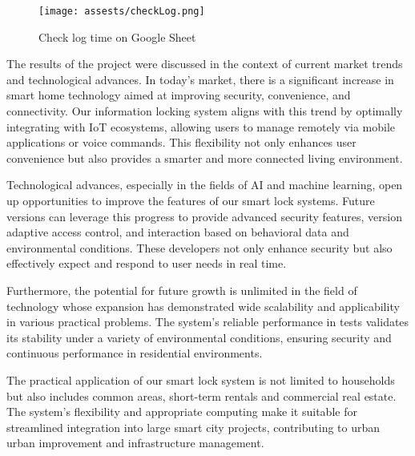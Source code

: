 \documentclass[conference, onecolumn]{IEEEtran}
\makeatletter
\def\subsection{\@startsection{subsection}{2}{\z@}{0.7ex plus 1ex minus 0.2ex}{0.5ex plus 0.2ex}{\normalfont\normalsize\bfseries}}
\makeatother
\begin{document}
\begin{figure}[H]
    \centering
    \texttt{[image: assests/checkLog.png]}
    \caption{Check log time on Google Sheet}
    \label{fig:googlesheet}
\end{figure}

\subsection{Discussion}
The results of the project were discussed in the context of current market trends and technological advances. In today's market, there is a significant increase in smart home technology aimed at improving security, convenience, and connectivity. Our information locking system aligns with this trend by optimally integrating with IoT ecosystems, allowing users to manage remotely via mobile applications or voice commands. This flexibility not only enhances user convenience but also provides a smarter and more connected living environment.

Technological advances, especially in the fields of AI and machine learning, open up opportunities to improve the features of our smart lock systems. Future versions can leverage this progress to provide advanced security features, version adaptive access control, and interaction based on behavioral data and environmental conditions. These developers not only enhance security but also effectively expect and respond to user needs in real time.

Furthermore, the potential for future growth is unlimited in the field of technology whose expansion has demonstrated wide scalability and applicability in various practical problems. The system's reliable performance in tests validates its stability under a variety of environmental conditions, ensuring security and continuous performance in residential environments.

The practical application of our smart lock system is not limited to households but also includes common areas, short-term rentals and commercial real estate. The system's flexibility and appropriate computing make it suitable for streamlined integration into large smart city projects, contributing to urban urban improvement and infrastructure management.
\end{document}
